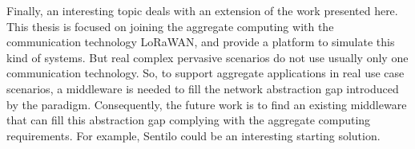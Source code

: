 Finally, an interesting topic deals with an extension of the work presented here.
This thesis is focused on joining the aggregate computing with the communication technology LoRaWAN, and provide a platform to simulate this kind of systems.
But real complex pervasive scenarios do not use usually only one communication technology.
So, to support aggregate applications in real use case scenarios, a middleware is needed to fill the network abstraction gap introduced by the paradigm.
Consequently, the future work is to find an existing middleware that can fill this abstraction gap complying with the aggregate computing requirements. For example, Sentilo could be an interesting starting solution.